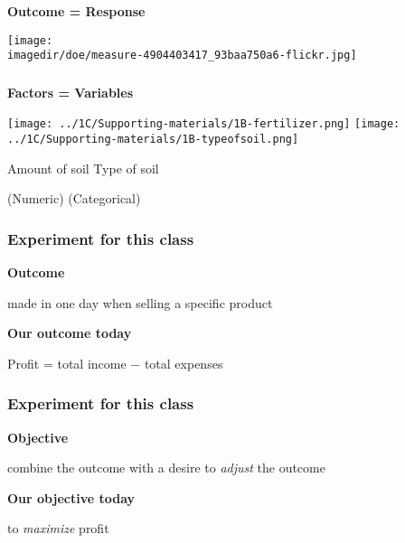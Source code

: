 \begin{frame}\frametitle{}
	\LARGE \textbf{{\color{purple} Outcome = Response}}
	
	
	
	\begin{flushright}
		\texttt{[image: \\imagedir/doe/measure-4904403417\_93baa750a6-flickr.jpg]}
		
	\end{flushright}
\end{frame}

\begin{frame}\frametitle{}
	\LARGE \textbf{{\color{purple} Factors = Variables}}
	
	
	
	\begin{flushright}
		\texttt{[image: ../1C/Supporting-materials/1B-fertilizer.png]}
		\texttt{[image: ../1C/Supporting-materials/1B-typeofsoil.png]}

		Amount of soil	\hfill Type of soil 
		
		(Numeric)	\hfill (Categorical)
	\end{flushright}
\end{frame}

\begin{frame}\frametitle{Experiment for this class}
	
	{\LARGE\textbf{{\color{purple} Outcome}}}
	
		 made in one day when selling a specific product
		
	\vspace{24pt}
	\pause
	
	{\LARGE\textbf{{\color{purple} Our outcome today}}}
	
		\qquad 	Profit = total income $-$ total expenses


	
\end{frame}

\begin{frame}\frametitle{Experiment for this class}
	
	{\LARGE\textbf{{\color{purple} Objective}}}
	
	
		\qquad combine the {\color{purple} outcome} with a desire to \emph{adjust} the outcome
		
	\vspace{24pt}
	\pause
	
	{\LARGE\textbf{{\color{purple} Our objective today}}}
	
		\qquad 	to \emph{maximize} profit
\end{frame}

